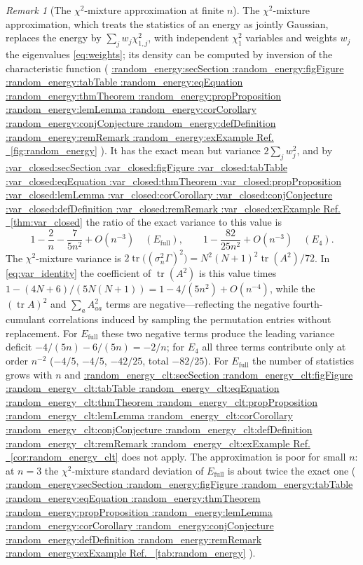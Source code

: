 \documentclass[11pt,a4paper]{article}
\makeatletter
\def\Cref@getprefix#1:#2\relax{#1}
\def\Cref@prefix@sec{sec}
\def\Cref@prefix@fig{fig}
\def\Cref@prefix@tab{tab}
\def\Cref@prefix@eq{eq}
\def\Cref@prefix@thm{thm}
\def\Cref@prefix@prop{prop}
\def\Cref@prefix@lem{lem}
\def\Cref@prefix@cor{cor}
\def\Cref@prefix@conj{conj}
\def\Cref@prefix@def{def}
\def\Cref@prefix@rem{rem}
\def\Cref@prefix@ex{ex}
\def\Cref@type@cap#1{%
  \edef\Cref@tmp{#1}%
  \ifx\Cref@tmp\Cref@prefix@sec Section%
  \else\ifx\Cref@tmp\Cref@prefix@fig Figure%
  \else\ifx\Cref@tmp\Cref@prefix@tab Table%
  \else\ifx\Cref@tmp\Cref@prefix@eq Equation%
  \else\ifx\Cref@tmp\Cref@prefix@thm Theorem%
  \else\ifx\Cref@tmp\Cref@prefix@prop Proposition%
  \else\ifx\Cref@tmp\Cref@prefix@lem Lemma%
  \else\ifx\Cref@tmp\Cref@prefix@cor Corollary%
  \else\ifx\Cref@tmp\Cref@prefix@conj Conjecture%
  \else\ifx\Cref@tmp\Cref@prefix@def Definition%
  \else\ifx\Cref@tmp\Cref@prefix@rem Remark%
  \else\ifx\Cref@tmp\Cref@prefix@ex Example%
  \else Ref.%
  \fi\fi\fi\fi\fi\fi\fi\fi\fi\fi\fi\fi
}
\DeclareRobustCommand{\Cref}[1]{%
  \begingroup
  \edef\Cref@label{#1}%
  \edef\Cref@prefix{\expandafter\Cref@getprefix\Cref@label:\relax}%
  \hyperref[#1]{\Cref@type@cap{\Cref@prefix}~\ref*{#1}}%
  \endgroup
}
\theoremstyle{plain}
\theoremstyle{definition}
\theoremstyle{remark}
\newtheorem{remark}[theorem]{Remark}
\newcommand{\Efull}{E_{\mathrm{full}}}
\newcommand{\Efour}{E_4}
\newcommand{\tr}{\operatorname{tr}}
\makeatother
\begin{document}
\begin{remark}[The $\chi^2$-mixture approximation at finite $n$]
\label{rem:gauss_mixture}
The $\chi^2$-mixture approximation, which treats the statistics of an energy as jointly Gaussian, replaces the energy by $\sum_jw_j\chi^2_{1,j}$, with independent $\chi^2_1$ variables and weights $w_j$ the eigenvalues \eqref{eq:weights}; its density can be computed by inversion of the characteristic function \cite{imhof1961} (\Cref{fig:random_energy}).
It has the exact mean but variance $2\sum_jw_j^2$, and by \Cref{thm:var_closed} the ratio of the exact variance to this value is
\[
1-\frac2n-\frac{7}{5n^2}+O(n^{-3})\quad(\Efull),\qquad 1-\frac{82}{25n^2}+O(n^{-3})\quad(\Efour).
\]
The $\chi^2$-mixture variance is $2\tr\bigl((\sigma_n^2\Gamma)^2\bigr)=N^2(N+1)^2\tr(A^2)/72$.
In \eqref{eq:var_identity} the coefficient of $\tr(A^2)$ is this value times $1-(4N+6)/(5N(N+1))=1-4/(5n^2)+O(n^{-4})$, while the $(\tr A)^2$ and $\sum_aA_{aa}^2$ terms are negative—reflecting the negative fourth-cumulant correlations induced by sampling the permutation entries without replacement.
For $\Efull$ these two negative terms produce the leading variance deficit $-4/(5n)-6/(5n)=-2/n$; for $\Efour$ all three terms contribute only at order $n^{-2}$ ($-4/5$, $-4/5$, $-42/25$, total $-82/25$).
For $\Efull$ the number of statistics grows with $n$ and \Cref{cor:random_energy_clt} does not apply.
The approximation is poor for small $n$: at $n=3$ the $\chi^2$-mixture standard deviation of $\Efull$ is about twice the exact one (\Cref{tab:random_energy}).
\end{remark}
\end{document}
